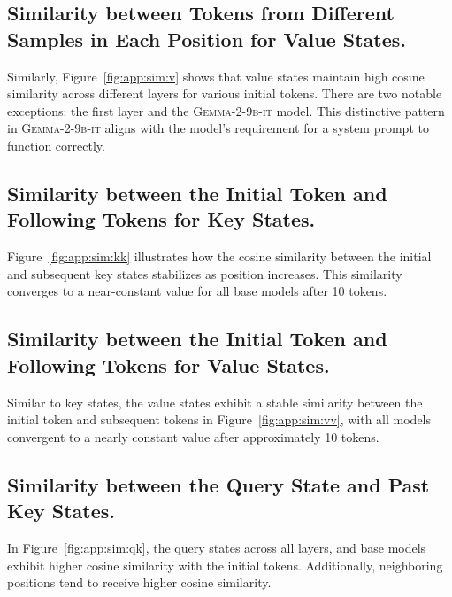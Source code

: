 

\subsection{Similarity between Tokens from Different Samples in Each Position for Value States.}

Similarly, Figure~\ref{fig:app:sim:v} shows that value states maintain high cosine similarity across different layers for various initial tokens. There are two notable exceptions: the first layer and the \textsc{Gemma-2-9b-it} model. This distinctive pattern in \textsc{Gemma-2-9b-it} aligns with the model's requirement for a system prompt to function correctly.



\subsection{Similarity between the Initial Token and Following Tokens for Key States.}

Figure~\ref{fig:app:sim:kk} illustrates how the cosine similarity between the initial and subsequent key states stabilizes as position increases. This similarity converges to a near-constant value for all base models after 10 tokens. 



\subsection{Similarity between the Initial Token and Following Tokens for Value States.}

Similar to key states, the value states exhibit a stable similarity between the initial token and subsequent tokens in Figure~\ref{fig:app:sim:vv}, with all models convergent to a nearly constant value after approximately 10 tokens.



\subsection{Similarity between the Query State and Past Key States.}

In Figure~\ref{fig:app:sim:qk}, the query states across all layers, and base models exhibit higher cosine similarity with the initial tokens. Additionally, neighboring positions tend to receive higher cosine similarity.

